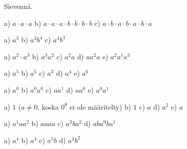         
    
    Sievennä.
    \begin{tehtava}
        a) $a\cdot a\cdot a$ \quad
        b) $a\cdot a\cdot a\cdot b\cdot b\cdot b\cdot b$ \quad
        c) $a\cdot b\cdot a\cdot b\cdot a\cdot b\cdot a$
        
        \begin{vastaus}
            a) $a^3$ \qquad
            b) $a^3b^4$ \qquad
            c) $a^4b^3$
        \end{vastaus}
    \end{tehtava}
    
    \begin{tehtava}
        a) $a^2\cdot a^3$ \qquad
        b) $a^3a^2$ \qquad
        c) $a^2 a$ \qquad
        d) $a a^2 a$ \qquad
        e) $a^2a^1a^3$
        
        \begin{vastaus}
            a) $a^5$ \qquad
            b) $a^5$ \qquad
            c) $a^3$ \qquad
            d) $a^4$ \qquad
            e) $a^6$
        \end{vastaus}
    \end{tehtava}
    
    \begin{tehtava}
        a) $a^0$ \qquad
        b) $a^0a^0$ \qquad
        c) $a a^1$ \qquad
        d) $aa^0$ \qquad
        e) $a^0a^1$
        
        \begin{vastaus}
            a) $1$ \quad ($a\neq0$, koska $0^0$ ei ole määritelty) \qquad
            b) $1$ \qquad
            c) $a$ \qquad
            d) $a^2$ \qquad
            e) $a$
        \end{vastaus}
    \end{tehtava}
    
    \begin{tehtava}
        a) $a^1 a a^2$ \qquad
        b) $aaaa$ \qquad
        c) $a^3ba^2$ \qquad
        d) $aba^0ba^1$
        
        \begin{vastaus}
            a) $ a^4$ \qquad
            b) $a^4$ \qquad
            c) $a^5b$ \qquad
            d) $a^2b^2$
        \end{vastaus}
    \end{tehtava}
    
